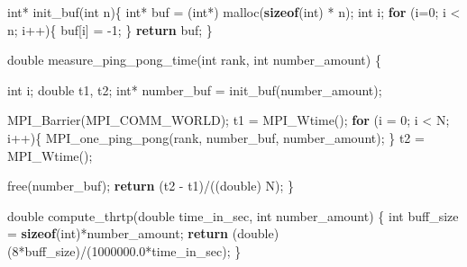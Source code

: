 \documentclass[11pt]{article}
\newenvironment{Shaded}{}{}
\newcommand{\KeywordTok}[1]{\textcolor[rgb]{0.00,0.44,0.13}{\textbf{{#1}}}}
\newcommand{\DataTypeTok}[1]{\textcolor[rgb]{0.56,0.13,0.00}{{#1}}}
\newcommand{\DecValTok}[1]{\textcolor[rgb]{0.25,0.63,0.44}{{#1}}}
\newcommand{\FloatTok}[1]{\textcolor[rgb]{0.25,0.63,0.44}{{#1}}}
\newcommand{\NormalTok}[1]{{#1}}
\newcommand{\ControlFlowTok}[1]{\textcolor[rgb]{0.00,0.44,0.13}{\textbf{{#1}}}}
\newcommand{\OperatorTok}[1]{\textcolor[rgb]{0.40,0.40,0.40}{{#1}}}
\begin{document}
\begin{Shaded}
\begin{Highlighting}[]
\DataTypeTok{int}\OperatorTok{*}\NormalTok{ init\_buf}\OperatorTok{(}\DataTypeTok{int}\NormalTok{ n}\OperatorTok{)\{}
  \DataTypeTok{int}\OperatorTok{*}\NormalTok{ buf }\OperatorTok{=} \OperatorTok{(}\DataTypeTok{int}\OperatorTok{*)}\NormalTok{ malloc}\OperatorTok{(}\KeywordTok{sizeof}\OperatorTok{(}\DataTypeTok{int}\OperatorTok{)} \OperatorTok{*}\NormalTok{ n}\OperatorTok{);}
  \DataTypeTok{int}\NormalTok{ i}\OperatorTok{;}
  \ControlFlowTok{for} \OperatorTok{(}\NormalTok{i}\OperatorTok{=}\DecValTok{0}\OperatorTok{;}\NormalTok{ i }\OperatorTok{\textless{}}\NormalTok{ n}\OperatorTok{;}\NormalTok{ i}\OperatorTok{++)\{}
\NormalTok{     buf}\OperatorTok{[}\NormalTok{i}\OperatorTok{]} \OperatorTok{=} \OperatorTok{{-}}\DecValTok{1}\OperatorTok{;}
  \OperatorTok{\}}
  \ControlFlowTok{return}\NormalTok{ buf}\OperatorTok{;}
\OperatorTok{\}}

\DataTypeTok{double}\NormalTok{ measure\_ping\_pong\_time}\OperatorTok{(}\DataTypeTok{int}\NormalTok{ rank}\OperatorTok{,} \DataTypeTok{int}\NormalTok{ number\_amount}\OperatorTok{)} \OperatorTok{\{}
  
  \DataTypeTok{int}\NormalTok{ i}\OperatorTok{;}
  \DataTypeTok{double}\NormalTok{ t1}\OperatorTok{,}\NormalTok{ t2}\OperatorTok{;}
  \DataTypeTok{int}\OperatorTok{*}\NormalTok{ number\_buf }\OperatorTok{=}\NormalTok{ init\_buf}\OperatorTok{(}\NormalTok{number\_amount}\OperatorTok{);}

\NormalTok{  MPI\_Barrier}\OperatorTok{(}\NormalTok{MPI\_COMM\_WORLD}\OperatorTok{);}
\NormalTok{  t1 }\OperatorTok{=}\NormalTok{ MPI\_Wtime}\OperatorTok{();}
  \ControlFlowTok{for} \OperatorTok{(}\NormalTok{i }\OperatorTok{=} \DecValTok{0}\OperatorTok{;}\NormalTok{ i }\OperatorTok{\textless{}}\NormalTok{ N}\OperatorTok{;}\NormalTok{ i}\OperatorTok{++)\{}
\NormalTok{     MPI\_one\_ping\_pong}\OperatorTok{(}\NormalTok{rank}\OperatorTok{,}\NormalTok{ number\_buf}\OperatorTok{,}\NormalTok{ number\_amount}\OperatorTok{);}    
  \OperatorTok{\}} 
\NormalTok{  t2 }\OperatorTok{=}\NormalTok{ MPI\_Wtime}\OperatorTok{();}

\NormalTok{  free}\OperatorTok{(}\NormalTok{number\_buf}\OperatorTok{);}
  \ControlFlowTok{return} \OperatorTok{(}\NormalTok{t2 }\OperatorTok{{-}}\NormalTok{ t1}\OperatorTok{)/((}\DataTypeTok{double}\OperatorTok{)}\NormalTok{ N}\OperatorTok{);}
\OperatorTok{\}}

\DataTypeTok{double}\NormalTok{ compute\_thrtp}\OperatorTok{(}\DataTypeTok{double}\NormalTok{ time\_in\_sec}\OperatorTok{,} \DataTypeTok{int}\NormalTok{ number\_amount}\OperatorTok{)} \OperatorTok{\{}
  \DataTypeTok{int}\NormalTok{ buff\_size }\OperatorTok{=} \KeywordTok{sizeof}\OperatorTok{(}\DataTypeTok{int}\OperatorTok{)*}\NormalTok{number\_amount}\OperatorTok{;}
  \ControlFlowTok{return} \OperatorTok{(}\DataTypeTok{double}\OperatorTok{)} \OperatorTok{(}\DecValTok{8}\OperatorTok{*}\NormalTok{buff\_size}\OperatorTok{)/(}\FloatTok{1000000.0}\OperatorTok{*}\NormalTok{time\_in\_sec}\OperatorTok{);}
\OperatorTok{\}}


\end{Highlighting}
\end{Shaded}
\end{document}
